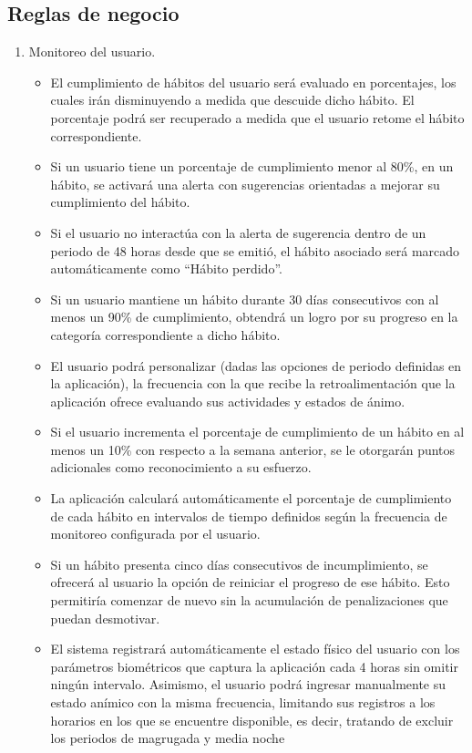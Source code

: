 \documentclass[letterpaper,12pt,oneside]{article}
\begin{document}
        \subsection{Reglas de negocio}
            \begin{enumerate}
                \item Monitoreo del usuario.
                    \begin{itemize}
                        \item El cumplimiento de hábitos del usuario será evaluado en porcentajes, los cuales irán disminuyendo a medida que descuide dicho hábito. El porcentaje podrá ser recuperado a medida que el usuario retome el hábito correspondiente.
                        \item Si un usuario tiene un porcentaje de cumplimiento menor al 80\%, en un hábito, se activará una alerta con sugerencias orientadas a mejorar su cumplimiento del hábito.
                        \item Si el usuario no interactúa con la alerta de sugerencia dentro de un periodo de 48 horas desde que se emitió, el hábito asociado será marcado automáticamente como “Hábito perdido”.
                        \item Si un usuario mantiene un hábito durante 30 días consecutivos con al menos un 90\% de cumplimiento, obtendrá un logro por su progreso en la categoría correspondiente a dicho hábito.
                        \item El usuario podrá personalizar (dadas las opciones de periodo definidas en la aplicación), la frecuencia con la que recibe la retroalimentación que la aplicación ofrece evaluando sus actividades y estados de ánimo.
                        \item Si el usuario incrementa el porcentaje de cumplimiento de un hábito en al menos un 10\% con respecto a la semana anterior, se le otorgarán puntos adicionales como reconocimiento a su esfuerzo.
                        \item La aplicación calculará automáticamente el porcentaje de cumplimiento de cada hábito en intervalos de tiempo definidos según la frecuencia de monitoreo configurada por el usuario.
                        \item Si un hábito presenta cinco días consecutivos de incumplimiento, se ofrecerá al usuario la opción de reiniciar el progreso de ese hábito. Esto permitiría comenzar de nuevo sin la acumulación de penalizaciones que puedan desmotivar.
                        \item El sistema registrará automáticamente el estado físico del usuario con los parámetros biométricos que captura la aplicación cada 4 horas sin omitir ningún intervalo. Asimismo, el usuario podrá ingresar manualmente su estado anímico con la misma frecuencia, limitando sus registros a los horarios en los que se encuentre disponible, es decir, tratando de excluir los periodos de magrugada y media noche

\end{itemize}
\end{enumerate}
\end{document}

